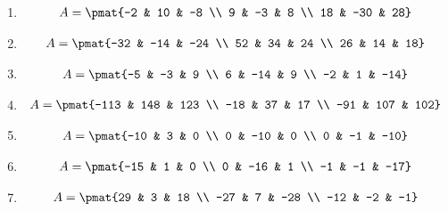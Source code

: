 \begin{enumerate}
\item

\begin{align*}
A = \pmat{-2 & 10 & -8 \\ 9 & -3 & 8 \\ 18 & -30 & 28}
\end{align*}

\item

\begin{align*}
A = \pmat{-32 & -14 & -24 \\ 52 & 34 & 24 \\ 26 & 14 & 18}
\end{align*}

\item

\begin{align*}
A = \pmat{-5 & -3 & 9 \\ 6 & -14 & 9 \\ -2 & 1 & -14}
\end{align*}

\item

\begin{align*}
A = \pmat{-113 & 148 & 123 \\ -18 & 37 & 17 \\ -91 & 107 & 102}
\end{align*}

\item

\begin{align*}
A = \pmat{-10 & 3 & 0 \\ 0 & -10 & 0 \\ 0 & -1 & -10}
\end{align*}

\item

\begin{align*}
A = \pmat{-15 & 1 & 0 \\ 0 & -16 & 1 \\ -1 & -1 & -17}
\end{align*}

\item

\begin{align*}
A = \pmat{29 & 3 & 18 \\ -27 & 7 & -28 \\ -12 & -2 & -1}
\end{align*}


\end{enumerate}
